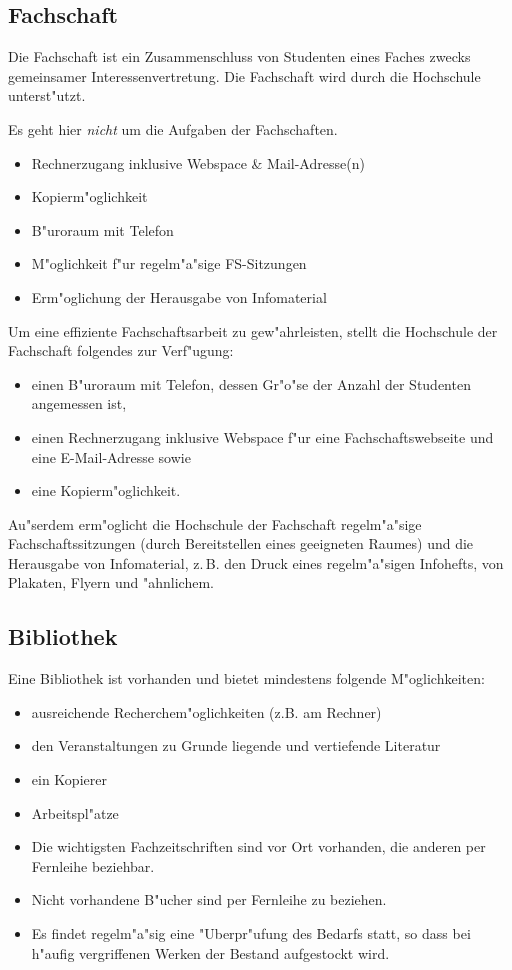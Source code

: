 \subsection{Fachschaft}

Die Fachschaft ist ein Zusammenschluss von Studenten eines Faches zwecks gemeinsamer Interessenvertretung.
Die Fachschaft wird durch die Hochschule unterst"utzt.

\begin{kcmt}\begin{komacmt}
Es geht hier \emph{nicht} um die Aufgaben der Fachschaften.

\begin{itemize}
	\item Rechnerzugang inklusive Webspace \& Mail-Adresse(n)
	\item Kopierm"oglichkeit
	\item B"uroraum mit Telefon
	\item M"oglichkeit f"ur regelm"a"sige FS-Sitzungen
	\item Erm"oglichung der Herausgabe von Infomaterial
\end{itemize}
\end{komacmt}\end{kcmt}

Um eine effiziente Fachschaftsarbeit zu gew"ahrleisten, stellt die Hochschule der Fachschaft folgendes zur Verf"ugung:
\begin{itemize}
	\item einen B"uroraum mit Telefon, dessen Gr"o"se der Anzahl der Studenten angemessen ist,
	\item einen Rechnerzugang inklusive Webspace f"ur eine Fachschaftswebseite und
		eine E-Mail-Adresse sowie
	\item eine Kopierm"oglichkeit.
\end{itemize}

Au"serdem erm"oglicht die Hochschule der Fachschaft regelm"a"sige
Fachschaftssitzungen (durch Bereitstellen eines geeigneten Raumes) und die
Herausgabe von Infomaterial, z.\,B. den Druck eines regelm"a"sigen Infohefts, von Plakaten,
Flyern und "ahnlichem. 

\newpage
\subsection{Bibliothek}
Eine Bibliothek ist vorhanden und bietet mindestens folgende M"oglichkeiten:
\begin{itemize}
	\item ausreichende Recherchem"oglichkeiten (z.B. am Rechner)
	\item den Veranstaltungen zu Grunde liegende und vertiefende Literatur
	\item ein Kopierer
	\item Arbeitspl"atze
	\item Die wichtigsten Fachzeitschriften sind vor Ort vorhanden, die anderen 
		per Fernleihe beziehbar.
	\item Nicht vorhandene B"ucher sind per Fernleihe zu beziehen.
	\item Es findet regelm"a"sig eine "Uberpr"ufung des Bedarfs statt, 
		so dass bei h"aufig vergriffenen Werken der Bestand aufgestockt wird.
\end{itemize}
